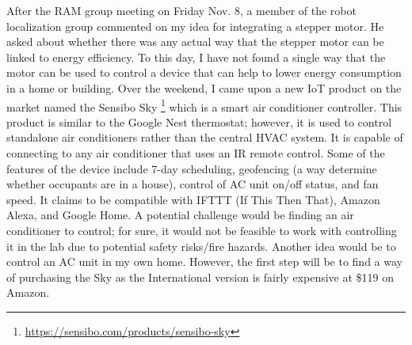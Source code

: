 \documentclass[fontsize=11pt, %
                             paper=letter, %
                             twoside, %
                             captions=tableheading,
                             index=totoc,
                             hyperref]{labbook}
\begin{document}
After the RAM group meeting on Friday Nov. 8, a member of the robot localization group commented on my idea for integrating a stepper motor. He asked about whether there was any actual way that the stepper motor can be linked to energy efficiency. To this day, I have not found a single way that the motor can be used to control a device that can help to lower energy consumption in a home or building. Over the weekend, I came upon a new IoT product on the market named the Sensibo Sky \footnote{\url{https://sensibo.com/products/sensibo-sky}} which is a smart air conditioner controller. This product is similar to the Google Nest thermostat; however, it is used to control standalone air conditioners rather than the central HVAC system. It is capable of connecting to any air conditioner that uses an IR remote control. Some of the features of the device include 7-day scheduling, geofencing (a way determine whether occupants are in a house), control of AC unit on/off status, and fan speed. It claims to be compatible with IFTTT (If This Then That), Amazon Alexa, and Google Home. A potential challenge would be finding an air conditioner to control; for sure, it would not be feasible to work with controlling it in the lab due to potential safety risks/fire hazards. Another idea would be to control an AC unit in my own home. However, the first step will be to find a way of purchasing the Sky as the International version is fairly expensive at \$119 on Amazon.








\end{document}
